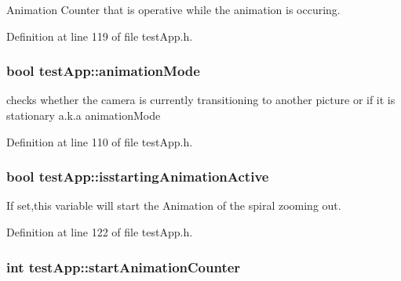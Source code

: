 Animation Counter that is operative while the animation is occuring. 



Definition at line 119 of file test\-App.\-h.

\hypertarget{group___camera_animation_ga2a5d49fd1f7f50f745f56095a1fa0099}{
\subsubsection[{animation\-Mode}]{\setlength{\rightskip}{0pt plus 5cm}bool test\-App\-::animation\-Mode}}\label{group___camera_animation_ga2a5d49fd1f7f50f745f56095a1fa0099}


checks whether the camera is currently transitioning to another picture or if it is stationary a.\-k.\-a animation\-Mode 



Definition at line 110 of file test\-App.\-h.

\hypertarget{group___camera_animation_gab8a277e1055730fb5d6786ce0c4804b2}{
\subsubsection[{isstarting\-Animation\-Active}]{\setlength{\rightskip}{0pt plus 5cm}bool test\-App\-::isstarting\-Animation\-Active}}\label{group___camera_animation_gab8a277e1055730fb5d6786ce0c4804b2}


If set,this variable will start the Animation of the spiral zooming out. 



Definition at line 122 of file test\-App.\-h.

\hypertarget{group___camera_animation_ga577bf117cf10109de967ea0d3ca17f1f}{
\subsubsection[{start\-Animation\-Counter}]{\setlength{\rightskip}{0pt plus 5cm}int test\-App\-::start\-Animation\-Counter}}\label{group___camera_animation_ga577bf117cf10109de967ea0d3ca17f1f}


